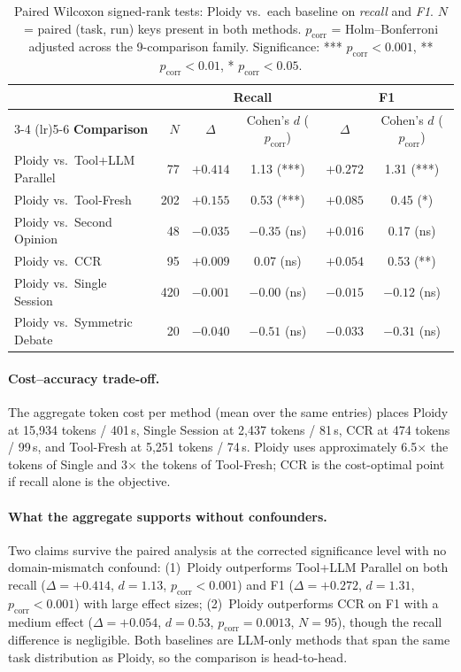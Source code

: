 \documentclass[11pt]{article}
\begin{document}
\begin{table}[t]
\centering
\caption{Paired Wilcoxon signed-rank tests: Ploidy vs.\ each baseline on \emph{recall} and \emph{F1}. $N$ = paired (task, run) keys present in both methods. $p_\text{corr}$ = Holm--Bonferroni adjusted across the 9-comparison family. Significance: *** $p_\text{corr}<0.001$, ** $p_\text{corr}<0.01$, * $p_\text{corr}<0.05$.}
\label{tab:agg-pairwise}
\small
\begin{tabular}{@{}lrcccc@{}}
\toprule
& & \multicolumn{2}{c}{\textbf{Recall}} & \multicolumn{2}{c}{\textbf{F1}} \\
\cmidrule(lr){3-4} \cmidrule(lr){5-6}
\textbf{Comparison} & $N$ & $\Delta$ & Cohen's $d$ ($p_\text{corr}$) & $\Delta$ & Cohen's $d$ ($p_\text{corr}$) \\
\midrule
Ploidy vs.\ Tool+LLM Parallel & 77  & $+0.414$ & 1.13 (***)\phantom{ns} & $+0.272$ & 1.31 (***)\phantom{ns} \\
Ploidy vs.\ Tool-Fresh        & 202 & $+0.155$ & 0.53 (***)\phantom{ns} & $+0.085$ & 0.45 (\phantom{**}*)\phantom{n} \\
Ploidy vs.\ Second Opinion    & 48  & $-0.035$ & $-0.35$ (ns) & $+0.016$ & 0.17 (ns) \\
Ploidy vs.\ CCR               & 95  & $+0.009$ & 0.07 (ns) & $+0.054$ & 0.53 (\phantom{*}**) \\
Ploidy vs.\ Single Session    & 420 & $-0.001$ & $-0.00$ (ns) & $-0.015$ & $-0.12$ (ns) \\
Ploidy vs.\ Symmetric Debate  & 20  & $-0.040$ & $-0.51$ (ns) & $-0.033$ & $-0.31$ (ns) \\
\bottomrule
\end{tabular}
\end{table}

\paragraph{Cost--accuracy trade-off.} The aggregate token cost per method (mean over the same entries) places Ploidy at 15{,}934 tokens / 401\,s, Single Session at 2{,}437 tokens / 81\,s, CCR at 474 tokens / 99\,s, and Tool-Fresh at 5{,}251 tokens / 74\,s. Ploidy uses approximately 6.5$\times$ the tokens of Single and 3$\times$ the tokens of Tool-Fresh; CCR is the cost-optimal point if recall alone is the objective.

\paragraph{What the aggregate supports without confounders.} Two claims survive the paired analysis at the corrected significance level with no domain-mismatch confound: (1)~Ploidy outperforms Tool+LLM Parallel on both recall ($\Delta = +0.414$, $d = 1.13$, $p_\text{corr} < 0.001$) and F1 ($\Delta = +0.272$, $d = 1.31$, $p_\text{corr} < 0.001$) with large effect sizes; (2)~Ploidy outperforms CCR on F1 with a medium effect ($\Delta = +0.054$, $d = 0.53$, $p_\text{corr} = 0.0013$, $N = 95$), though the recall difference is negligible. Both baselines are LLM-only methods that span the same task distribution as Ploidy, so the comparison is head-to-head.
\end{document}
